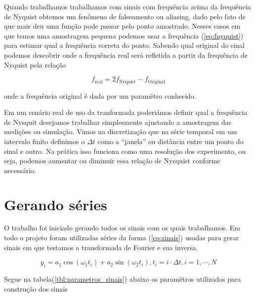 \documentclass[a4paper, 11pt]{article}
\begin{document}
Quando trabalhamos trabalhamos com sinais com frequência acima da frequência de Nyquist obtemos um
fenômeno de falseamento ou aliasing, dado pelo fato de que mais deu uma função pode passar pelo
ponto amostrado. Nesses casos em que temos uma amostragem pequena podemos usar a frequência
(\ref{eq:fnyquist}) para estimar qual a frequência correta do ponto. Sabendo qual original do sinal
podemos descobrir onde a frequência real será refletida a partir da frequência de Nyquist pela relação

\begin{equation}
f_{\text{real}} = 2 f_{\text{Nyquist}} - f_{\text{Original}}  
\label{eq:achar_frequencia}
\end{equation}

onde a frequência original é dada por um paramêtro conhecido.


Em um cenário real de uso da tranformada poderiámos definir qual a frequência de Nysquit desejamos
trabalhar simplesmente ajustando a amostragem das medições ou simulação. Vimos na discretização que
na série temporal em um intervalo finito definimos o \( \Delta t \) como a ``janela'' ou distância entre
um ponto do sinal e outro. Na prática isso funciona como uma resolução dos experimento, ou seja,
podemos aumentar ou diminuir essa relação de Nysquist conforme necessário.

\section{Gerando séries}

O trabalho foi iniciado gerando todos os sinais com os quais trabalhamos. Em todo o
projeto foram utilizadas séries da forma (\ref{eq:sinais}) usadas para gerar sinais
em que testamos a transformada de Fourier e sua inversa.

\begin{equation}
  y_i = a_1 \cos (\omega_1 t_i)   + a_2 \sin (\omega_2 t_i) , t_i = i \cdot  \Delta t , i = 1, \cdots , N
  \label{eq:sinais}
\end{equation}


Segue na tabela(\ref{tbl:parametros_sinais}) abaixo os paramêtros utilizados para construção dos sinais
\end{document}
